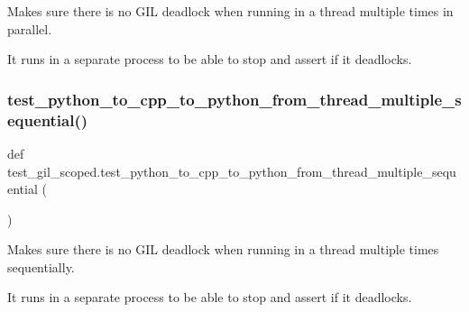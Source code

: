\begin{DoxyVerb}Makes sure there is no GIL deadlock when running in a thread multiple times in parallel.

It runs in a separate process to be able to stop and assert if it deadlocks.
\end{DoxyVerb}
 \mbox{\label{namespacetest__gil__scoped_ada15f4c3cc5f3b87c470073a6e296537}} 
\subsubsection{\texorpdfstring{test\_python\_to\_cpp\_to\_python\_from\_thread\_multiple\_sequential()}{test\_python\_to\_cpp\_to\_python\_from\_thread\_multiple\_sequential()}}
{\footnotesize\ttfamily def test\+\_\+gil\+\_\+scoped.\+test\+\_\+python\+\_\+to\+\_\+cpp\+\_\+to\+\_\+python\+\_\+from\+\_\+thread\+\_\+multiple\+\_\+sequential (\begin{DoxyParamCaption}{ }\end{DoxyParamCaption})}

\begin{DoxyVerb}Makes sure there is no GIL deadlock when running in a thread multiple times sequentially.

It runs in a separate process to be able to stop and assert if it deadlocks.
\end{DoxyVerb}
 
